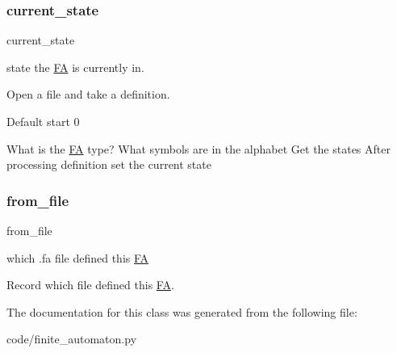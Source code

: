 \subsubsection{\texorpdfstring{current\+\_\+state}{current\_state}}
{\footnotesize\ttfamily current\+\_\+state}



state the \mbox{\hyperlink{classfinite__automaton_1_1_f_a}{FA}} is currently in. 

Open a file and take a definition.

Default start 0

What is the \mbox{\hyperlink{classfinite__automaton_1_1_f_a}{FA}} type? What symbols are in the alphabet Get the states After processing definition set the current state \mbox{\label{classfinite__automaton_1_1_f_a_a584285fe507e7e46c15601255510836e}} 
\subsubsection{\texorpdfstring{from\+\_\+file}{from\_file}}
{\footnotesize\ttfamily from\+\_\+file}



which .fa file defined this \mbox{\hyperlink{classfinite__automaton_1_1_f_a}{FA}} 

Record which file defined this \mbox{\hyperlink{classfinite__automaton_1_1_f_a}{FA}}. 

The documentation for this class was generated from the following file\+:\begin{DoxyCompactItemize}
\item 
code/finite\+\_\+automaton.\+py\end{DoxyCompactItemize}
